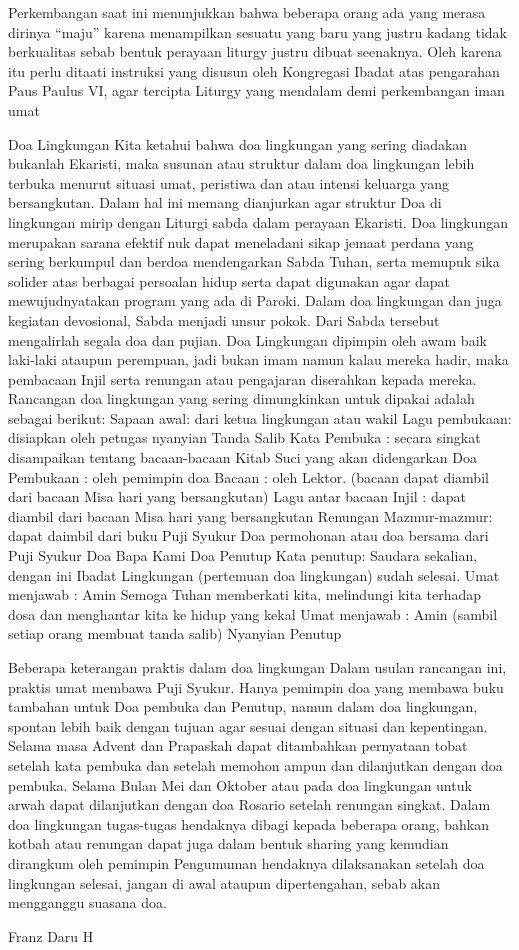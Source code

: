 Perkembangan saat ini menunjukkan bahwa beberapa orang ada yang merasa dirinya “maju” karena menampilkan sesuatu yang baru yang justru kadang tidak berkualitas sebab bentuk perayaan liturgy justru dibuat seenaknya. Oleh karena itu perlu ditaati instruksi yang disusun oleh Kongregasi Ibadat atas pengarahan Paus Paulus VI, agar tercipta Liturgy yang mendalam demi perkembangan iman umat

Doa Lingkungan
Kita ketahui bahwa doa lingkungan yang sering diadakan bukanlah Ekaristi, maka susunan atau struktur dalam doa lingkungan lebih terbuka menurut situasi umat, peristiwa dan atau intensi keluarga yang bersangkutan. Dalam hal ini memang dianjurkan agar struktur Doa di lingkungan mirip dengan Liturgi sabda dalam perayaan Ekaristi.
Doa lingkungan merupakan sarana efektif nuk dapat meneladani sikap jemaat perdana yang sering berkumpul dan berdoa mendengarkan Sabda Tuhan, serta memupuk sika solider atas berbagai persoalan hidup serta dapat digunakan agar dapat mewujudnyatakan program yang ada di Paroki.
Dalam doa lingkungan dan juga kegiatan devosional, Sabda menjadi unsur pokok. Dari Sabda tersebut mengalirlah segala doa dan pujian. Doa Lingkungan dipimpin oleh awam baik laki-laki ataupun perempuan, jadi bukan imam namun kalau mereka hadir, maka pembacaan Injil serta renungan atau pengajaran diserahkan kepada mereka.
Rancangan doa lingkungan yang sering dimungkinkan untuk dipakai adalah sebagai berikut:
Sapaan awal: dari ketua lingkungan atau wakil
Lagu pembukaan: disiapkan oleh petugas nyanyian
Tanda Salib
Kata Pembuka : secara singkat disampaikan tentang bacaan-bacaan Kitab Suci yang akan didengarkan
Doa Pembukaan : oleh pemimpin doa
Bacaan : oleh Lektor. (bacaan dapat diambil dari bacaan Misa hari yang bersangkutan)
Lagu antar bacaan
Injil : dapat diambil dari bacaan Misa hari yang bersangkutan
Renungan
Mazmur-mazmur: dapat daimbil dari buku Puji Syukur
Doa permohonan atau doa bersama dari Puji Syukur
Doa Bapa Kami
Doa Penutup
Kata penutup: Saudara sekalian, dengan ini Ibadat Lingkungan (pertemuan doa lingkungan) sudah selesai.
Umat menjawab : Amin
Semoga Tuhan memberkati kita, melindungi kita terhadap dosa dan menghantar kita ke hidup yang kekal
Umat menjawab : Amin (sambil setiap orang membuat tanda salib)
Nyanyian Penutup

Beberapa keterangan praktis dalam doa lingkungan
Dalam usulan rancangan ini, praktis umat membawa Puji Syukur. Hanya pemimpin doa yang membawa buku tambahan untuk Doa pembuka dan Penutup, namun dalam doa lingkungan, spontan lebih baik dengan tujuan agar sesuai dengan situasi dan kepentingan.
Selama masa Advent dan Prapaskah dapat ditambahkan pernyataan tobat setelah kata pembuka dan setelah memohon ampun dan dilanjutkan dengan doa pembuka.
Selama Bulan Mei dan Oktober atau pada doa lingkungan untuk arwah dapat dilanjutkan dengan doa Rosario setelah renungan singkat.
Dalam doa lingkungan tugas-tugas hendaknya dibagi kepada beberapa orang, bahkan kotbah atau renungan dapat juga dalam bentuk sharing yang kemudian dirangkum oleh pemimpin
Pengumuman hendaknya dilaksanakan setelah doa lingkungan selesai, jangan di awal ataupun dipertengahan, sebab akan mengganggu suasana doa.

Franz Daru H